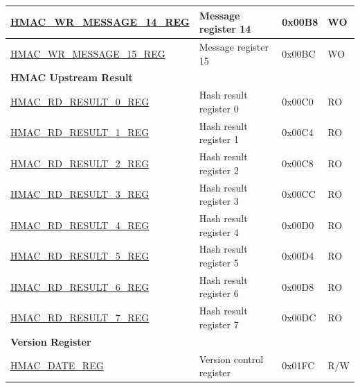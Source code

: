 \begin{longtable}{ | p{6cm} | p{7.2cm} | p{1.3cm} | p{1cm} | }
\hyperref[regdesc:HMACWRMESSAGENREG]{HMAC\_WR\_MESSAGE\_14\_REG} & Message register 14 & 0x00B8 & WO \\ \hline
\hyperref[regdesc:HMACWRMESSAGENREG]{HMAC\_WR\_MESSAGE\_15\_REG} & Message register 15 & 0x00BC & WO \\ \hline
\multicolumn{4}{|l|}{\textbf{HMAC Upstream Result}} \\ \hline
\hyperref[regdesc:HMACRDRESULTNREG]{HMAC\_RD\_RESULT\_0\_REG} & Hash result register 0 & 0x00C0 & RO \\ \hline
\hyperref[regdesc:HMACRDRESULTNREG]{HMAC\_RD\_RESULT\_1\_REG} & Hash result register 1 & 0x00C4 & RO \\ \hline
\hyperref[regdesc:HMACRDRESULTNREG]{HMAC\_RD\_RESULT\_2\_REG} & Hash result register 2 & 0x00C8 & RO \\ \hline
\hyperref[regdesc:HMACRDRESULTNREG]{HMAC\_RD\_RESULT\_3\_REG} & Hash result register 3 & 0x00CC & RO \\ \hline
\hyperref[regdesc:HMACRDRESULTNREG]{HMAC\_RD\_RESULT\_4\_REG} & Hash result register 4 & 0x00D0 & RO \\ \hline
\hyperref[regdesc:HMACRDRESULTNREG]{HMAC\_RD\_RESULT\_5\_REG} & Hash result register 5 & 0x00D4 & RO \\ \hline
\hyperref[regdesc:HMACRDRESULTNREG]{HMAC\_RD\_RESULT\_6\_REG} & Hash result register 6 & 0x00D8 & RO \\ \hline
\hyperref[regdesc:HMACRDRESULTNREG]{HMAC\_RD\_RESULT\_7\_REG} & Hash result register 7 & 0x00DC & RO \\ \hline
\multicolumn{4}{|l|}{\textbf{Version Register}} \\ \hline
\hyperref[regdesc:HMACDATEREG]{HMAC\_DATE\_REG} & Version control register & 0x01FC & R/W \\ \hline
\end{longtable}
